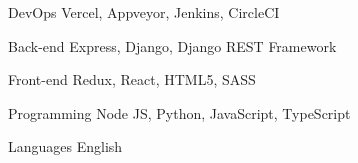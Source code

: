 

\begin{cvskills}

  \cvskill
    {DevOps} %
    {Vercel, Appveyor, Jenkins, CircleCI} %

  \cvskill
    {Back-end} %
    {Express, Django, Django REST Framework} %

  \cvskill
    {Front-end} %
    {Redux, React, HTML5, SASS} %

  \cvskill
    {Programming} %
    {Node JS, Python, JavaScript, TypeScript} %

  \cvskill
    {Languages} %
    {English} %

\end{cvskills}
